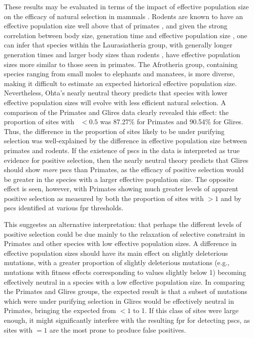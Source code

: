 These results may be evaluated in terms of the impact of effective
population size on the efficacy of natural selection in mammals
\citep{Popadin2007,Nikolaev2007a,Ellegren2009}. Rodents are known to
have an effective population size well above that of primates
\citep{Kosiol2008}, and given the strong correlation between body
size, generation time and effective population size
\citep{Nikolaev2007a}, one can infer that species within the
Laurasiatheria group, with generally longer generation times and
larger body sizes than rodents \citep{Hou2009}, have effective
population sizes more similar to those seen in primates. The
Afrotheria group, containing species ranging from small moles to
elephants and manatees, is more diverse, making it difficult to
estimate an expected historical effective population
size. Nevertheless, Ohta's nearly neutral theory \citep{Ohta1992}
predicts that species with lower effective population sizes will
evolve with less efficient natural selection. A comparison of the
Primates and Glires data clearly revealed this effect: the proportion
of sites with \omgml~$<0.5$ was 87.27\% for Primates and 90.54\% for
Glires. Thus, the difference in the proportion of sites likely to be
under purifying selection was well-explained by the difference in
effective population size between primates and rodents. If the
existence of \acp{psc} in the \sw data is interpreted as true evidence
for positive selection, then the nearly neutral theory predicts that
Glires should show \emph{more} \acp{psc} than Primates, as the
efficacy of positive selection would be greater in the species with a
larger effective population size. The opposite effect is seen,
however, with Primates showing much greater levels of apparent
positive selection as measured by both the proportion of sites with
\omgml$>1$ and by \acp{psc} identified at various \ac{fpr} thresholds.

This suggestes an alternative interpretation: that perhaps the
different levels of positive selection could be due mainly to the
relaxation of selective constraint in Primates and other species with
low effective population sizes. A difference in effective population
sizes should have its main effect on slightly deleterious mutations,
with a greater proportion of slightly deleterious mutations (e.g.,
mutations with fitness effects corresponding to \dnds values slightly
below 1) becoming effectively neutral in a species with a low
effective population size. In comparing the Primates and Glires
groups, the expected result is that a subset of mutations which were
under purifying selection in Glires would be effectively neutral in
Primates, bringing the expected \omg from $<1$ to 1. If this class of
sites were large enough, it might significantly interfere with the
resulting \ac{fpr} for detecting \acp{psc}, as sites with \omg$=1$ are
the most prone to produce false positives.

